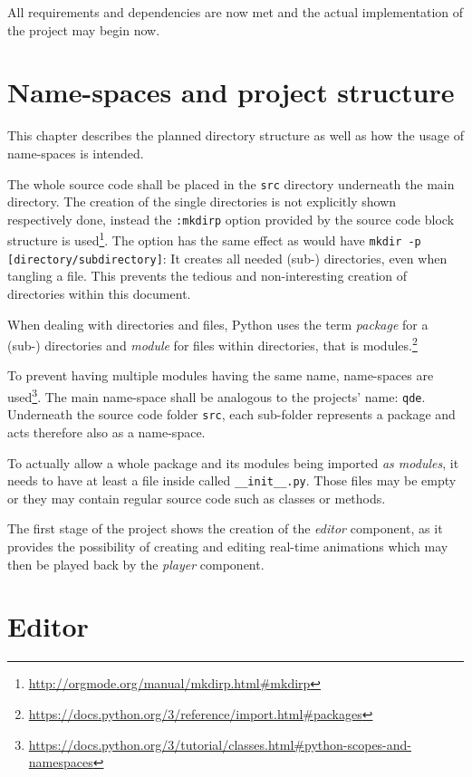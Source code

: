 \documentclass[10pt, openright, notitlepage]{scrreprt}
\begin{document}
All requirements and dependencies are now met and the actual implementation of
the project may begin now.

\section{Name-spaces and project structure}
\label{sec:org6b6580b}

This chapter describes the planned directory structure as well as how the usage
of name-spaces is intended.

The whole source code shall be placed in the \texttt{src} directory underneath the main
directory. The creation of the single directories is not explicitly shown
respectively done, instead the \texttt{:mkdirp} option provided by the source code
block structure is used\footnote{\url{http://orgmode.org/manual/mkdirp.html\#mkdirp}}. The
option has the same effect as would have \texttt{mkdir -p [directory/subdirectory]}: It
creates all needed (sub-) directories, even when tangling a file. This prevents
the tedious and non-interesting creation of directories within this document.

When dealing with directories and files, Python uses the term \emph{package} for a
(sub-) directories and \emph{module} for files within directories, that is
modules.\footnote{\url{https://docs.python.org/3/reference/import.html\#packages}}

To prevent having multiple modules having the same name, name-spaces are
used\footnote{\url{https://docs.python.org/3/tutorial/classes.html\#python-scopes-and-namespaces}}.
The main name-space shall be analogous to the projects' name: \texttt{qde}. Underneath
the source code folder \texttt{src}, each sub-folder represents a package and acts
therefore also as a name-space.

To actually allow a whole package and its modules being imported \emph{as modules},
it needs to have at least a file inside called \texttt{\_\_init\_\_.py}. Those files may be
empty or they may contain regular source code such as classes or methods.

The first stage of the project shows the creation of the \emph{editor} component, as
it provides the possibility of creating and editing real-time animations which
may then be played back by the \emph{player} component\cite[p. 29]{osterwalder_qde_2016}.

\section{Editor}
\label{sec:org3e891e8}
\end{document}
